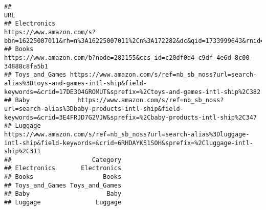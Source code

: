 \documentclass[
]{article}
\begin{document}
\begin{verbatim}
##                                                                                                                                                                             URL
## Electronics                                            https://www.amazon.com/s?bbn=16225007011&rh=n%3A16225007011%2Cn%3A172282&dc&qid=1733999643&rnid=2941120011&ref=sr_nr_n_1
## Books                                                                                          https://www.amazon.com/b?node=283155&ccs_id=c20df0d4-c9df-4e6d-8c00-34888c8fa5b1
## Toys_and_Games https://www.amazon.com/s/ref=nb_sb_noss?url=search-alias%3Dtoys-and-games-intl-ship&field-keywords=&crid=17DE3O4GROMUT&sprefix=%2Ctoys-and-games-intl-ship%2C382
## Baby             https://www.amazon.com/s/ref=nb_sb_noss?url=search-alias%3Dbaby-products-intl-ship&field-keywords=&crid=3E4FRJD7G2VJW&sprefix=%2Cbaby-products-intl-ship%2C347
## Luggage                       https://www.amazon.com/s/ref=nb_sb_noss?url=search-alias%3Dluggage-intl-ship&field-keywords=&crid=6RHDAYK51SOH&sprefix=%2Cluggage-intl-ship%2C311
##                      Category
## Electronics       Electronics
## Books                   Books
## Toys_and_Games Toys_and_Games
## Baby                     Baby
## Luggage               Luggage
\end{verbatim}
\end{document}
